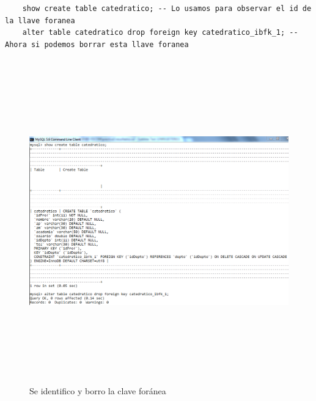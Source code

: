\documentclass[12pt, titlepage]{article}
\begin{document}
    \begin{lstlisting}
    show create table catedratico; -- Lo usamos para observar el id de la llave foranea
    alter table catedratico drop foreign key catedratico_ibfk_1; -- Ahora si podemos borrar esta llave foranea
    \end{lstlisting}
    \begin{figure}[H]
        \begin{center}
            \includegraphics[width=16cm, height=14cm]{img/constraint.png}
            \caption{Se identifico y borro la clave foránea}
            \label{fig:constraint}
        \end{center}
    \end{figure}
\end{document}
